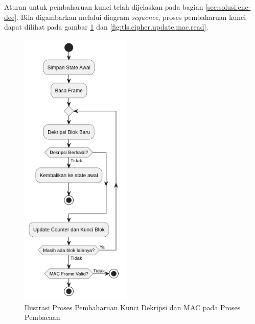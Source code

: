 Aturan untuk pembaharuan kunci telah dijelaskan pada bagian \ref{sec:solusi.enc-dec}. Bila digambarkan melalui diagram \emph{sequence}, proses pembaharuan kunci dapat dilihat pada gambar \ref{fig:tls.cipher.update.mac.write} dan \ref{fig:tls.cipher.update.mac.read}.


\begin{figure}[!h]
  \centering
  \includegraphics[width=200px]{chapters/res/chapter-3/img/update.write.png}
  \caption{Ilustrasi Proses Pembaharuan Kunci Dekripsi dan MAC pada Proses Pembacaan} \label{fig:tls.cipher.update.mac.write}
\end{figure}

